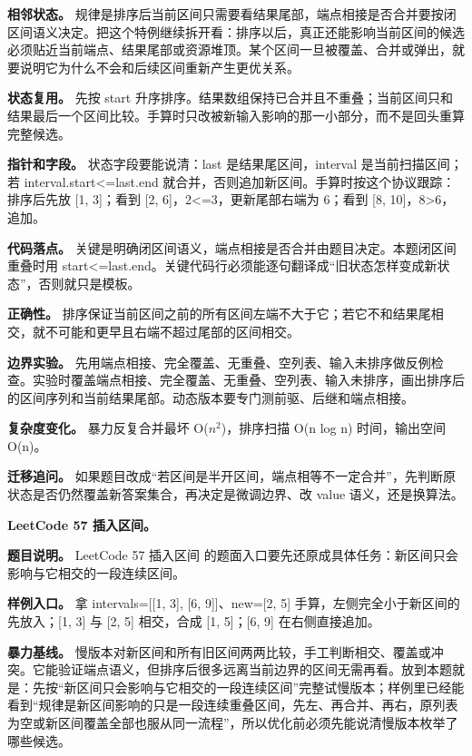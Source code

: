 \textbf{相邻状态。} 规律是排序后当前区间只需要看结果尾部，端点相接是否合并要按闭区间语义决定。把这个特例继续拆开看：排序以后，真正还能影响当前区间的候选必须贴近当前端点、结果尾部或资源堆顶。某个区间一旦被覆盖、合并或弹出，就要说明它为什么不会和后续区间重新产生更优关系。

\textbf{状态复用。} 先按 start 升序排序。结果数组保持已合并且不重叠；当前区间只和结果最后一个区间比较。手算时只改被新输入影响的那一小部分，而不是回头重算完整候选。

\textbf{指针和字段。} 状态字段要能说清：last 是结果尾区间，interval 是当前扫描区间；若 interval.start<=last.end 就合并，否则追加新区间。手算时按这个协议跟踪：排序后先放 [1, 3]；看到 [2, 6]，2<=3，更新尾部右端为 6；看到 [8, 10]，8>6，追加。

\textbf{代码落点。} 关键是明确闭区间语义，端点相接是否合并由题目决定。本题闭区间重叠时用 start<=last.end。关键代码行必须能逐句翻译成“旧状态怎样变成新状态”，否则就只是模板。

\textbf{正确性。} 排序保证当前区间之前的所有区间左端不大于它；若它不和结果尾相交，就不可能和更早且右端不超过尾部的区间相交。

\textbf{边界实验。} 先用端点相接、完全覆盖、无重叠、空列表、输入未排序做反例检查。实验时覆盖端点相接、完全覆盖、无重叠、空列表、输入未排序，画出排序后的区间序列和当前结果尾部。动态版本要专门测前驱、后继和端点相接。

\textbf{复杂度变化。} 暴力反复合并最坏 O(\ensuremath{n^{2}})，排序扫描 O(n log n) 时间，输出空间 O(n)。

\textbf{迁移追问。} 如果题目改成“若区间是半开区间，端点相等不一定合并”，先判断原状态是否仍然覆盖新答案集合，再决定是微调边界、改 value 语义，还是换算法。

\noindent\textbf{LeetCode 57 插入区间。}

\textbf{题目说明。} LeetCode 57 插入区间 的题面入口要先还原成具体任务：新区间只会影响与它相交的一段连续区间。

\textbf{样例入口。} 拿 intervals=[[1, 3], [6, 9]]、new=[2, 5] 手算，左侧完全小于新区间的先放入；[1, 3] 与 [2, 5] 相交，合成 [1, 5]；[6, 9] 在右侧直接追加。

\textbf{暴力基线。} 慢版本对新区间和所有旧区间两两比较，手工判断相交、覆盖或冲突。它能验证端点语义，但排序后很多远离当前边界的区间无需再看。放到本题就是：先按“新区间只会影响与它相交的一段连续区间”完整试慢版本；样例里已经能看到“规律是新区间影响的只是一段连续重叠区间，先左、再合并、再右，原列表为空或新区间覆盖全部也服从同一流程”，所以优化前必须先能说清慢版本枚举了哪些候选。

